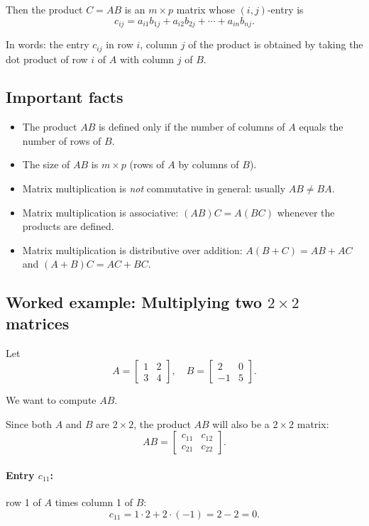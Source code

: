 \documentclass[12pt]{article}
\begin{document}
	Then the product $C = AB$ is an $m\times p$ matrix whose $(i,j)$-entry is
	\[
	c_{ij} = a_{i1}b_{1j} + a_{i2}b_{2j} + \cdots + a_{in}b_{nj}.
	\]
	
	In words: the entry $c_{ij}$ in row $i$, column $j$ of the product is obtained by taking the dot product of row $i$ of $A$ with column $j$ of $B$.
	
	\subsection*{Important facts}
	
	\begin{itemize}
		\item The product $AB$ is defined only if the number of columns of $A$ equals the number of rows of $B$.
		\item The size of $AB$ is $m\times p$ (rows of $A$ by columns of $B$).
		\item Matrix multiplication is \emph{not} commutative in general: usually $AB \neq BA$.
		\item Matrix multiplication is associative: $(AB)C = A(BC)$ whenever the products are defined.
		\item Matrix multiplication is distributive over addition: $A(B + C) = AB + AC$ and $(A + B)C = AC + BC$.
	\end{itemize}
	
	\subsection*{Worked example: Multiplying two $2\times 2$ matrices}
	
	Let
	\[
	A =
	\begin{bmatrix}
		1 & 2 \\
		3 & 4
	\end{bmatrix},
	\quad
	B =
	\begin{bmatrix}
		2 & 0 \\
		-1 & 5
	\end{bmatrix}.
	\]
	
	We want to compute $AB$.
	
	Since both $A$ and $B$ are $2\times 2$, the product $AB$ will also be a $2\times 2$ matrix:
	\[
	AB =
	\begin{bmatrix}
		c_{11} & c_{12} \\
		c_{21} & c_{22}
	\end{bmatrix}.
	\]
	
	\paragraph{Entry $c_{11}$:} row 1 of $A$ times column 1 of $B$:
	\[
	c_{11} = 1\cdot 2 + 2\cdot(-1) = 2 - 2 = 0.
	\]
	
\end{document}
